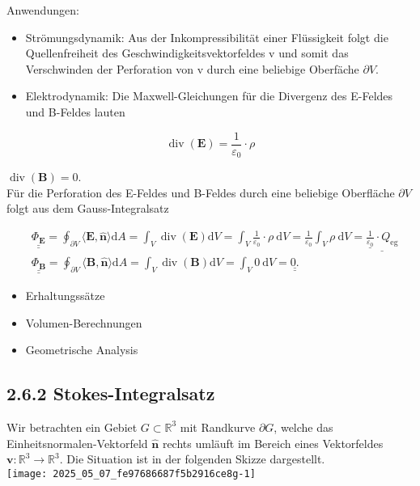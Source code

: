 \documentclass[10pt]{article}
\begin{document}
Anwendungen:

\begin{itemize}
  \item Strömungsdynamik: Aus der Inkompressibilität einer Flüssigkeit folgt die Quellenfreiheit des Geschwindigkeitsvektorfeldes v und somit das Verschwinden der Perforation von v durch eine beliebige Oberfäche $\partial V$.
  \item Elektrodynamik: Die Maxwell-Gleichungen für die Divergenz des E-Feldes und B-Feldes lauten
\end{itemize}


\begin{equation*}
\operatorname{div}(\mathbf{E})=\frac{1}{\varepsilon_{0}} \cdot \rho \tag{2.168}
\end{equation*}


$\operatorname{div}(\mathbf{B})=0$.\\
Für die Perforation des E-Feldes und B-Feldes durch eine beliebige Oberfläche $\partial V$ folgt aus dem Gauss-Integralsatz


\begin{align*}
& \underline{\underline{\Phi_{\mathbf{E}}}}=\oint_{\partial V}\langle\mathbf{E}, \hat{\mathbf{n}}\rangle \mathrm{d} A=\int_{V} \operatorname{div}(\mathbf{E}) \mathrm{d} V=\int_{V} \frac{1}{\varepsilon_{0}} \cdot \rho \mathrm{~d} V=\frac{1}{\varepsilon_{0}} \int_{V} \rho \mathrm{~d} V=\underline{\underline{\frac{1}{\varepsilon_{0}}} \cdot Q_{\mathrm{eg}}}  \tag{2.170}\\
& \underline{\underline{\Phi_{\mathbf{B}}}}=\oint_{\partial V}\langle\mathbf{B}, \hat{\mathbf{n}}\rangle \mathrm{d} A=\int_{V} \operatorname{div}(\mathbf{B}) \mathrm{d} V=\int_{V} 0 \mathrm{~d} V=\underline{\underline{0 .}} \tag{2.171}
\end{align*}


\begin{itemize}
  \item Erhaltungssätze
  \item Volumen-Berechnungen
  \item Geometrische Analysis
\end{itemize}

\subsection*{2.6.2 Stokes-Integralsatz}
Wir betrachten ein Gebiet $G \subset \mathbb{R}^{3}$ mit Randkurve $\partial G$, welche das Einheitsnormalen-Vektorfeld $\hat{\mathbf{n}}$ rechts umläuft im Bereich eines Vektorfeldes $\mathbf{v}: \mathbb{R}^{3} \rightarrow \mathbb{R}^{3}$. Die Situation ist in der folgenden Skizze dargestellt.\\
\texttt{[image: 2025\_05\_07\_fe97686687f5b2916ce8g-1]}
\end{document}
